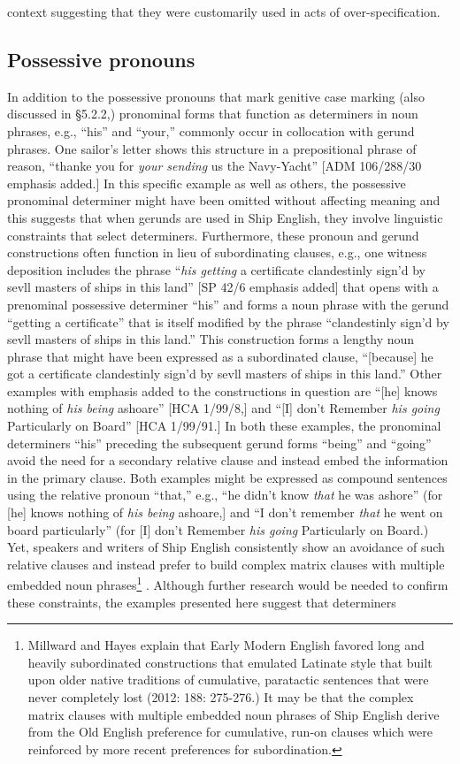 context suggesting that they were customarily used in acts of over-specification.  

\subsection{{Possessive} {pronouns}}%

  In addition to the possessive pronouns that mark genitive case marking (also discussed in §5.2.2,) pronominal forms that function as determiners in noun phrases, e.g., “his” and “your,” commonly occur in collocation with gerund phrases. One sailor’s letter shows this structure in a prepositional phrase of reason, “thanke you for \textit{your sending} us the Navy-Yacht” [ADM 106/288/30 emphasis added.] In this specific example as well as others, the possessive pronominal determiner might have been omitted without affecting meaning and this suggests that when gerunds are used in Ship English, they involve linguistic constraints that select determiners. Furthermore, these pronoun and gerund constructions often function in lieu of subordinating clauses, e.g., one witness deposition includes the phrase “\textit{his getting} a certificate clandestinly sign'd by sevll masters of ships in this land” [SP 42/6 emphasis added] that opens with a prenominal possessive determiner “his” and forms a noun phrase with the gerund “getting a certificate” that is itself modified by the phrase “clandestinly sign'd by sevll masters of ships in this land.” This construction forms a lengthy noun phrase that might have been expressed as a subordinated clause, “[because] he got a certificate clandestinly sign'd by sevll masters of ships in this land.” Other examples with emphasis added to the constructions in question are “[he] knows nothing of \textit{his being} ashoare” [HCA 1/99/8,] and “[I] don’t Remember \textit{his going} Particularly on Board” [HCA 1/99/91.] In both these examples, the pronominal determiners “his” preceding the subsequent gerund forms “being” and “going” avoid the need for a secondary relative clause and instead embed the information in the primary clause. Both examples might be expressed as compound sentences using the relative pronoun “that,” e.g., “he didn’t know \textit{that} he was ashore” (for [he] knows nothing of \textit{his being} ashoare,] and “I don’t remember \textit{that} he went on board particularly” (for [I] don’t Remember \textit{his going} Particularly on Board.) Yet, speakers and writers of Ship English consistently show an avoidance of such relative clauses and instead prefer to build complex matrix clauses with multiple embedded noun phrases\footnote{Millward and Hayes explain that Early Modern English favored long and heavily subordinated constructions that emulated Latinate style that built upon older native traditions of cumulative, paratactic sentences that were never completely lost (2012: 188: 275-276.) It may be that the complex matrix clauses with multiple embedded noun phrases of Ship English derive from the Old English preference for cumulative, run-on clauses which were reinforced by more recent preferences for subordination.} . Although further research would be needed to confirm these constraints, the examples presented here suggest that determiners 